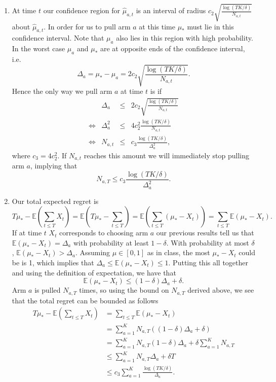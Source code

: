 \documentclass{article}
\newcommand{\E}[1]{\mathbb{E}\left(#1\right)}
\begin{document}
\begin{enumerate}
	\item At time $t$ our confidence region for $\hat \mu_{a,t}$ is an interval of radius $c_2\sqrt{\tfrac{\log(TK/\delta)}{N_{a,t}}}$ about $\hat \mu_{a,t}$. In order for us to pull arm $a$ at this time $\mu_*$ must lie in this confidence interval. Note that $\mu_a$ also lies in this region with high probability. In the worst case $\mu_a$ and $\mu_*$ are at opposite ends of the confidence interval, i.e.
	\begin{equation}
		\Delta_a=\mu_*-\mu_a = 2c_2\sqrt{\frac{\log(TK/\delta)}{N_{a,t}}}.
	\end{equation}
	Hence the only way we pull arm $a$ at time $t$ is if
	\begin{equation}
		\begin{array}{crcl}
			&\Delta_a &\leq& 2c_2\sqrt{\frac{\log(TK/\delta)}{N_{a,t}}}\\
			\iff& \Delta_a^2 &\leq& 4c_2^2\frac{\log(TK/\delta)}{N_{a,t}}\\
			\iff & N_{a,t} &\leq& c_3\frac{\log(TK/\delta)}{\Delta_a^2},
		\end{array}
	\end{equation}
	where $c_3=4c_2^2$. If $N_{a,t}$ reaches this amount we will immediately stop pulling arm $a$, implying that
	\begin{equation}
		N_{a,T}\leq c_3\frac{\log(TK/\delta)}{\Delta_a^2}.
	\end{equation}

	\item Our total expected regret is
	\begin{equation}
		T\mu_*-\E{\sum_{t\leq T}X_t} = \E{T\mu_*-\sum_{t\leq T}} = \E{\sum_{t\leq T}(\mu_*-X_t)}=\sum_{t\leq T}\E{\mu_*-X_t}.
	\end{equation}
	If at time $t$ $X_t$ corresponds to choosing arm $a$ our previous results tell us that $\E{\mu_*-X_t}=\Delta_a$ with probability at least $1-\delta$. With probability at most $\delta$, $\E{\mu_*-X_t}>\Delta_a$. Assuming $\mu\in[0,1]$ as in class, the most $\mu_*-X_t$ could be is 1, which implies that $\Delta_a\leq \E{\mu_*-X_t}\leq 1$. Putting this all together and using the definition of expectation, we have that
	\begin{equation}
		\E{\mu_*-X_t}\leq (1-\delta)\Delta_a + \delta.
	\end{equation}
	Arm $a$ is pulled $N_{a,T}$ times, so using the bound on $N_{a,T}$ derived above, we see that the total regret can be bounded as follows
	\begin{align}
		T\mu_*-\E{\sum_{t\leq T}X_t} &= \sum_{t\leq T}\E{\mu_*-X_t}\\
		&= \sum_{a=1}^K N_{a,T}\left( (1-\delta)\Delta_a + \delta\right)\\
		&= \sum_{a=1}^K N_{a,T}(1-\delta)\Delta_a + \delta\sum_{a=1}^K N_{a,T}\\
		&\leq \sum_{a=1}^K N_{a,T}\Delta_a + \delta T\\
		&\leq c_3\sum_{a=1}^K \frac{\log(TK/\delta)}{\Delta_a}.
	\end{align}

\end{enumerate}
\end{document}
